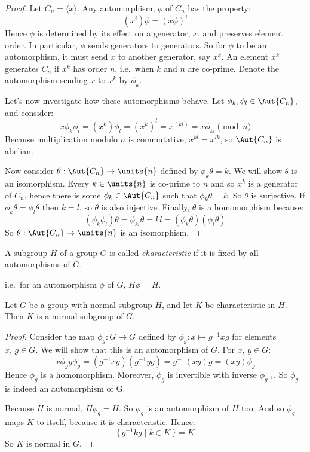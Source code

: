 \begin{proof}
    Let \(C_n = \langle x \rangle\).
    Any automorphism, \(\phi\) of \(C_n\) has the property:
    \[(x^i)\phi = {(x\phi)}^i\]
    Hence \(\phi\) is determined by its effect on a generator, \(x\), and preserves element
    order.
    In particular, \(\phi\) sends generators to generators.
    So for \(\phi\) to be an automorphism, it must send \(x\) to another generator, say \(x^k\).
    An element \(x^k\) generates \(C_n\) if \(x^k\) has order \(n\), i.e.\ when \(k\) and \(n\) are co-prime.
    Denote the automorphism sending \(x\) to \(x^k\) by \(\phi_k\).

    Let's now investigate how these automorphisms behave.
    Let \(\phi_k, \phi_l \in \Aut{C_n}\), and consider:
    \[x\phi_k\phi_l = (x^k)\phi_l = {(x^k)}^l = x^{(kl)} = x\phi_{kl} \pmod{n}\]
    Because multiplication modulo \(n\) is commutative, \(x^{kl} = x^{lk}\), so \(\Aut{C_n}\) is abelian.

    Now consider \(\theta:\Aut{C_n} \to \units{n}\) defined by \(\phi_k\theta = k\).
    We will show \(\theta\) is an isomorphism.
    Every \(k \in \units{n}\) is co-prime to \(n\) and so \(x^k\) is a generator of \(C_n\), hence there is some \(\phi_k
    \in \Aut{C_n}\) such that \(\phi_k\theta = k\).
    So \(\theta\) is surjective.
    If \(\phi_k\theta = \phi_l\theta\) then \(k = l\), so \(\theta\) is also injective.
    Finally, \(\theta\) is a homomorphism because:
    \[(\phi_k\phi_l)\theta = \phi_{kl}\theta = kl = (\phi_k\theta)(\phi_l\theta)\]
    So \(\theta:\Aut{C_n} \to \units{n}\) is an isomorphism.
\end{proof}

\begin{definition}
    \raggedright
    A subgroup \(H\) of a group \(G\) is called \emph{characteristic} if it is fixed by all automorphisms of
    \(G\).

    i.e.\ for an automorphism \(\phi\) of \(G\), \(H\phi = H\).
\end{definition}

\begin{lemma}\label{lem:char}
    \raggedright
    Let \(G\) be a group with normal subgroup \(H\), and let \(K\) be characteristic in \(H\).
    Then \(K\) is a normal subgroup of \(G\).
\end{lemma}

\begin{proof}
    Consider the map \(\phi_g:G \to G\) defined by \(\phi_g:x \mapsto g^{-1}xg\) for elements \(x,\,g \in G\).
    We will show that this is an automorphism of \(G\).
    For \(x,\,y \in G\):
    \[x\phi_g y\phi_g = (g^{-1}xg)(g^{-1}yg) = g^{-1}(xy)g = (xy)\phi_g\]
    Hence \(\phi_g\) is a homomorphism.
    Moreover, \(\phi_g\) is invertible with inverse \(\phi_{g^{-1}}\).
    So \(\phi_g\) is indeed an automorphism of G.

    Because \(H\) is normal, \(H\phi_g = H\).
    So \(\phi_g\) is an automorphism of \(H\) too.
    And so \(\phi_g\) maps \(K\) to itself, because it is characteristic.
    Hence:
    \[\{\,g^{-1}kg \mid k \in K\,\} = K\]
    So \(K\) is normal in \(G\).
\end{proof}

